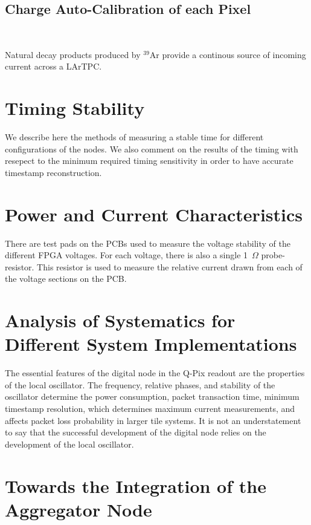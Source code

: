 \subsection{Charge Auto-Calibration of each Pixel}~\label{sec:charge_calibration}

Natural decay products produced by $^{39}$Ar provide a continous source of incoming current across a LArTPC.


\section{Timing Stability}

We describe here the methods of measuring a stable time for different configurations of the nodes.
We also comment on the results of the timing with resepect to the minimum required timing sensitivity in order to have accurate timestamp reconstruction.

\section{Power and Current Characteristics}

There are test pads on the PCBs used to measure the voltage stability of the different FPGA voltages.
For each voltage, there is also a single 1~$\unit{\Omega}$ probe-resistor.
This resistor is used to measure the relative current drawn from each of the voltage sections on the PCB.

\section{Analysis of Systematics for Different System Implementations}

The essential features of the digital node in the Q-Pix readout are the properties of the local oscillator.
The frequency, relative phases, and stability of the oscillator determine the power consumption, packet transaction time, minimum timestamp resolution, which determines maximum current measurements, and affects packet loss probability in larger tile systems.
It is not an understatement to say that the successful development of the digital node relies on the development of the local oscillator.

\section{Towards the Integration of the Aggregator Node}


